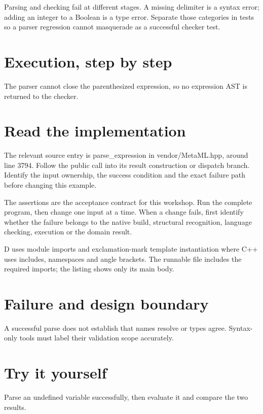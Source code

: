\clearpage
{}
Parsing and checking fail at different stages. A missing delimiter is a syntax error; adding an integer to a Boolean is a type error. Separate those categories in tests so a parser regression cannot masquerade as a successful checker test.


\section*{Execution, step by step}
The parser cannot close the parenthesized expression, so no expression AST is returned to the checker.

\section*{Read the implementation}
The relevant source entry is parse\_expression in vendor/MetaML.hpp, around line 3794. Follow the public call into its result construction or dispatch branch. Identify the input ownership, the success condition and the exact failure path before changing this example.

The assertions are the acceptance contract for this workshop. Run the complete program, then change one input at a time. When a change fails, first identify whether the failure belongs to the native build, structural recognition, language checking, execution or the domain result.

\clearpage
{}
D uses module imports and exclamation-mark template instantiation where C++ uses includes, namespaces and angle brackets. The runnable file includes the required imports; the listing shows only its main body.


\section*{Failure and design boundary}
A successful parse does not establish that names resolve or types agree. Syntax-only tools must label their validation scope accurately.

\section*{Try it yourself}
Parse an undefined variable successfully, then evaluate it and compare the two results.

